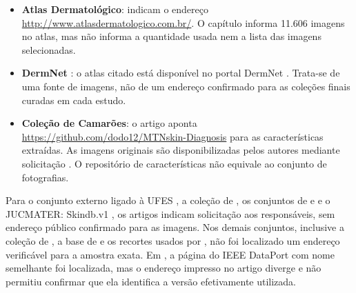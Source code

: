 \begin{itemize}
    \item \textbf{Atlas Dermatológico}:  indicam o endereço \url{http://www.atlasdermatologico.com.br/}. O capítulo informa 11.606 imagens no atlas, mas não informa a quantidade usada nem a lista das imagens selecionadas.
    \item \textbf{DermNet} \cite{baweja2023,jaikishore2021}: o atlas citado está disponível no portal DermNet \cite{dermnetAtlas}. Trata-se de uma fonte de imagens, não de um endereço confirmado para as coleções finais curadas em cada estudo.
    \item \textbf{Coleção de Camarões}: o artigo aponta \url{https://github.com/dodo12/MTNskin-Diagnosis} para as características extraídas. As imagens originais são disponibilizadas pelos autores mediante solicitação \cite{nyatte2022}. O repositório de características \cite{mtnskinRepositorio} não equivale ao conjunto de fotografias.
\end{itemize}

Para o conjunto externo ligado à UFES \cite{deps2026}, a coleção de , os conjuntos de  e  e o JUCMATER: Skindb.v1 \cite{banerjee2023}, os artigos indicam solicitação aos responsáveis, sem endereço público confirmado para as imagens. Nos demais conjuntos, inclusive a coleção de , a base de  e os recortes usados por , não foi localizado um endereço verificável para a amostra exata. Em , a página do IEEE DataPort com nome semelhante foi localizada, mas o endereço impresso no artigo diverge e não permitiu confirmar que ela identifica a versão efetivamente utilizada.
